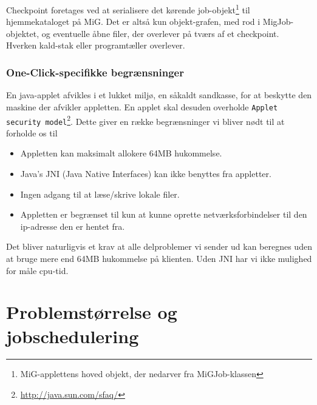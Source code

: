 \documentclass[final,a4paper,11pt]{article}
\newcommand{\mig}{MiG}
\newcommand{\oc}{One-Click}
\begin{document}
Checkpoint foretages ved at serialisere det kørende job-objekt\footnote{\mig-applettens hoved objekt, der nedarver fra MiGJob-klassen} til hjemmekataloget på \mig. Det er altså kun objekt-grafen, med rod i MigJob-objektet, og eventuelle åbne filer, der overlever på tværs af et checkpoint. Hverken kald-stak eller programtæller overlever.

\subsubsection{\oc-specifikke begrænsninger}\label{begraensninger}
En java-applet afvikles i et lukket miljø, en såkaldt sandkasse, for at beskytte den maskine der afvikler appletten. En applet skal desuden overholde \texttt{Applet security model}\footnote{\url{http://java.sun.com/sfaq/}}. Dette giver en række begrænsninger vi bliver nødt til at forholde os til
\begin{itemize}
	\item Appletten kan maksimalt allokere 64MB hukommelse.
	\item Java's JNI (Java Native Interfaces) kan ikke benyttes fra appletter. 
	\item Ingen adgang til at læse/skrive lokale filer.
	\item Appletten er begrænset til kun at kunne oprette netværksforbindelser til den ip-adresse den er hentet fra.
\end{itemize}

Det bliver naturligvis et krav at alle delproblemer vi sender ud kan beregnes uden at bruge mere end 64MB hukommelse på klienten. Uden JNI har vi ikke mulighed for måle cpu-tid.

\section{Problemstørrelse og jobschedulering}\label{opdelingogschedulering}
\end{document}
